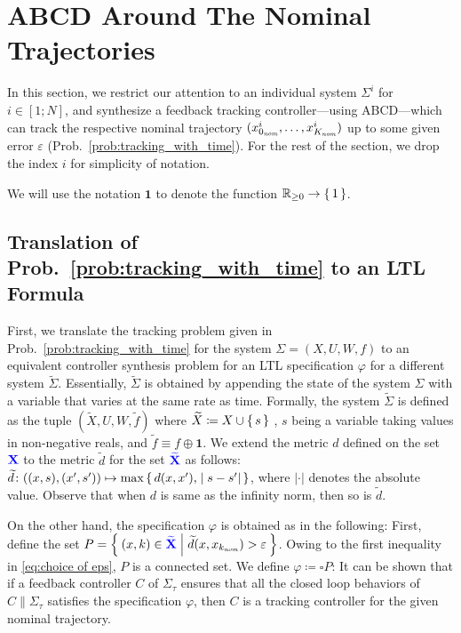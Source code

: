 \section{ABCD Around The Nominal Trajectories}\label{sec:tracking}

In this section, we restrict our attention to an individual system $\Sigma^i$ for $i\in [1;N]$, and synthesize a feedback tracking controller---using ABCD---which can track the respective nominal trajectory $(x_{0_{\mathit{nom}}}^i,\ldots,x_{K_{\mathit{nom}}}^i)$ up to some given error $\varepsilon$ (Prob.~\ref{prob:tracking_with_time}).
For the rest of the section, we drop the index $i$ for simplicity of notation.

We will use the notation $\mathbf{1}$ to denote the function $\mathbb{R}_{\geq 0}\to \set{1}$.

\subsection{Translation of Prob.~\ref{prob:tracking_with_time} to an LTL Formula}
First, we translate the tracking problem given in Prob.~\ref{prob:tracking_with_time} for the system $\Sigma=(X,U,W,f)$ to an equivalent controller synthesis problem for an LTL specification $\varphi$ for a different system $\widetilde{\Sigma}$.
Essentially, $\widetilde{\Sigma}$ is obtained by appending the state of the system $\Sigma$ with a variable that varies at the same rate as time.
Formally, the system $\widetilde{\Sigma}$ is defined as the tuple $(\widetilde{X}, U, W, \widetilde{f})$ where $\widetilde{X}\coloneqq X\cup \set{s}$ , $s$ being a variable taking values in non-negative reals, and $\widetilde{f} \equiv f \oplus \mathbf{1}$.
We extend the metric $d$ defined on the set ${\color{blue} \mathbf{X}}$ to the metric $\widetilde{d}$ for the set ${\color{blue} \mathbf{\widetilde{X}}}$ as follows:
$\widetilde{d}\colon ((x,s),(x',s')) \mapsto \max\set{d(x,x'), |s-s'|}$, where $|\cdot|$ denotes the absolute value.
Observe that when $d$ is same as the infinity norm, then so is $\widetilde{d}$.

On the other hand, the specification $\varphi$ is obtained as in the following:
First, define the set $P = \Set{(x,k)\in {\color{blue} \mathbf{\widetilde{X}}} | \widetilde{d}(x, x_{k_{\mathit{nom}}}) > \varepsilon}$.
Owing to the first inequality in \eqref{eq:choice of eps}, $P$ is a connected set.
We define $\varphi\coloneqq \square P$:
It can be shown that if a feedback controller $C$ of $\Sigma_\tau$ ensures that all the closed loop behaviors of $C\parallel \Sigma_\tau$ satisfies the specification $\varphi$, then $C$ is a tracking controller for the given nominal trajectory.

